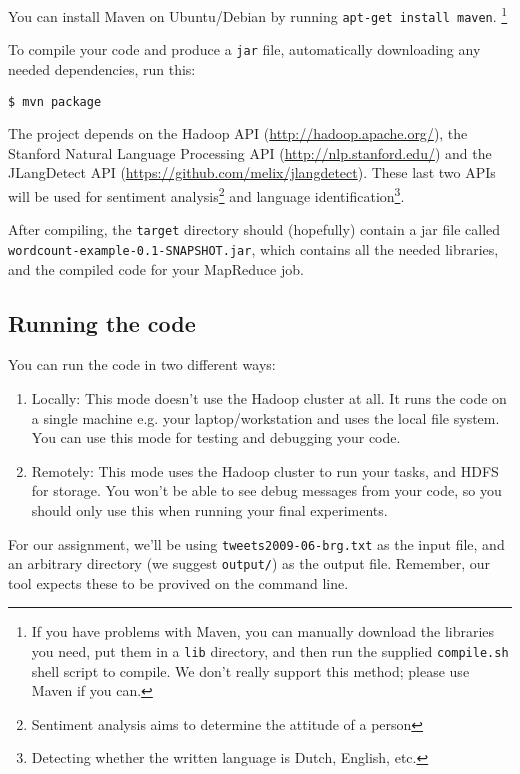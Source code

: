 \documentclass[a4paper,11pt]{article}
\begin{document}
  You can install Maven on Ubuntu/Debian by running \texttt{apt-get install maven}.
  \footnote{If you have problems with Maven, you can manually download the libraries you need, put them in a \texttt{lib} directory, and then run the supplied
  \texttt{compile.sh} shell script to compile. We don't really support this method; please use Maven if you can.}

  To compile your code and produce a \texttt{jar} file, automatically downloading any needed dependencies, run this:
\begin{lstlisting}
$ mvn package
\end{lstlisting}

  The project depends on the Hadoop API (\url{http://hadoop.apache.org/}), the Stanford Natural Language Processing API (\url{http://nlp.stanford.edu/}) and the JLangDetect API (\url{https://github.com/melix/jlangdetect}). These last two APIs will be used for sentiment analysis\footnote{Sentiment analysis aims to determine the attitude of a person} and language identification\footnote{Detecting whether the written language is Dutch, English, etc. }.

  After compiling, the \texttt{target} directory should (hopefully) contain a jar file called\\ \texttt{wordcount-example-0.1-SNAPSHOT.jar}, which contains
  all the needed libraries, and the compiled code for your MapReduce job.

   \subsection{Running the code}

  You can run the code in two different ways:

  \begin{enumerate}
    \item Locally: This mode doesn't use the Hadoop cluster at all. It runs the code on a single machine e.g. your laptop/workstation and uses the local file system. You can use this mode for testing and debugging your code.
    \item Remotely: This mode uses the Hadoop cluster to run your tasks, and HDFS for storage. You won't be able to see debug messages from your code, so you should only use this when running your final experiments.
  \end{enumerate}

For our assignment, we'll be using \texttt{tweets2009-06-brg.txt} as the input
file, and an arbitrary directory (we suggest \texttt{output/}) as the output file. Remember, our tool
expects these to be provived on the command line.
\end{document}
